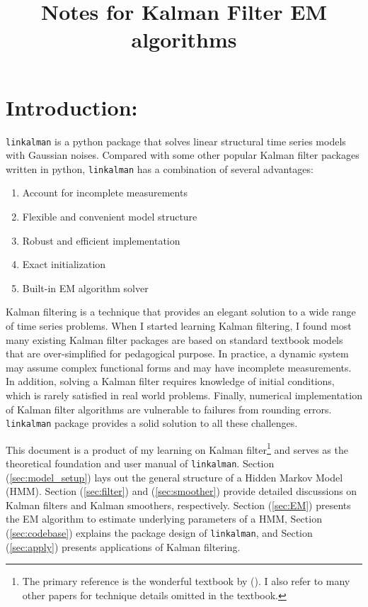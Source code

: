 \documentclass[12pt]{article}
\newenvironment{boenumerate}
    {\begin{enumerate}\renewcommand\labelenumi{\textbf\theenumi}}
    {\end{enumerate}}
\numberwithin{equation}{section}
\begin{document}
\title{Notes for Kalman Filter EM algorithms}

\section{Introduction:}
\texttt{linkalman} is a python package that solves linear structural time series models with Gaussian noises. Compared with some other popular Kalman filter packages written in python, \texttt{linkalman} has a combination of several advantages:
\begin{boenumerate}
    \item Account for incomplete measurements 
    \item Flexible and convenient model structure
    \item Robust and efficient implementation
    \item Exact initialization
    \item Built-in EM algorithm solver
\end{boenumerate}
Kalman filtering is a technique that provides an elegant solution to a wide range of time series problems. When I started learning Kalman filtering, I found most many existing Kalman filter packages are based on standard textbook models that are over-simplified for pedagogical purpose. In practice, a dynamic system may assume complex functional forms and may have incomplete measurements. In addition, solving a Kalman filter requires knowledge of initial conditions, which is rarely satisfied in real world problems. Finally, numerical implementation of Kalman filter algorithms are vulnerable to failures from rounding errors. \texttt{linkalman} package provides a solid solution to all these challenges. 

This document is a product of my learning on Kalman filter\footnote{The primary reference is the wonderful textbook by (\cite{durbin_koopman_2001}). I also refer to many other papers for technique details omitted in the textbook.} and serves as the theoretical foundation and user manual of \texttt{linkalman}. Section (\ref{sec:model_setup}) lays out the general structure of a Hidden Markov Model (HMM). Section (\ref{sec:filter}) and (\ref{sec:smoother}) provide detailed discussions on Kalman filters and Kalman smoothers, respectively. Section (\ref{sec:EM}) presents the EM algorithm to estimate underlying parameters of a HMM, Section (\ref{sec:codebase}) explains the package design of \texttt{linkalman}, and Section (\ref{sec:apply}) presents applications of Kalman filtering. 
\end{document}

